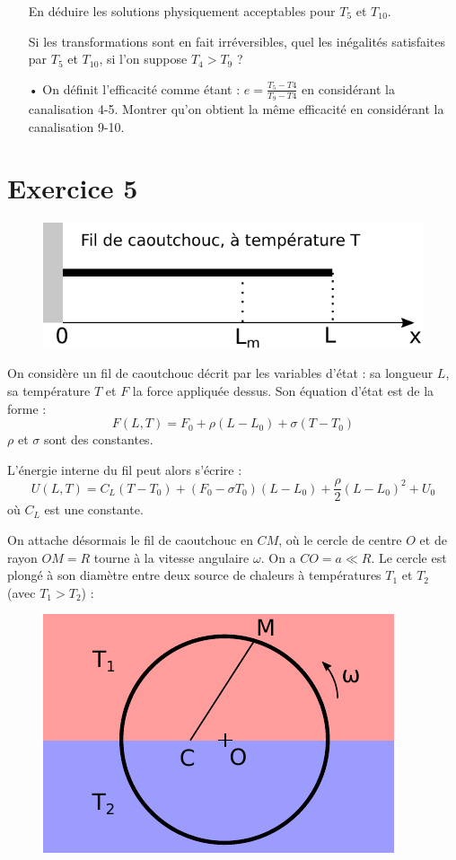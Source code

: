 \documentclass{report}
\begin{document}
\begin{itemize}
En déduire les solutions physiquement acceptables pour $T_{5}$ et $T_{10}$.

Si les transformations sont en fait irréversibles, quel les inégalités satisfaites par $T_{5}$ et $T_{10}$, si l'on suppose $T_{4}>T_{9}$ ?

\item[•] On définit l'efficacité comme étant : $e=\frac{T_{5}-T{4}}{T_{9}-T{4}}$ en considérant la canalisation 4-5. Montrer qu'on obtient la même efficacité en considérant la canalisation 9-10.
\end{itemize}

\newpage

\section*{Exercice 5}

\begin{figure}[!h]
\centering
\includegraphics[width=0.4\linewidth]{thermo2.pdf}
\end{figure}

On considère un fil de caoutchouc décrit par les variables d'état : sa longueur $L$, sa température $T$ et $F$ la force appliquée dessus. Son équation d'état est de la forme : 
\begin{equation}
	F(L,T) = F_0 + \rho(L-L_0) + \sigma(T-T_0)
\end{equation}
$\rho$ et $\sigma$ sont des constantes. 

L'énergie interne du fil peut alors s'écrire : 
\begin{equation}
	U(L,T) = C_L(T-T_0)+(F_0-\sigma T_0)(L-L_0) +\frac{ \rho}{2}(L-L_0)^2 +U_0
\end{equation}
où $C_L$ est une constante. 

On attache désormais le fil de caoutchouc en $CM$, où le cercle de centre $O$ et de rayon $OM=R$ tourne à la vitesse angulaire $\omega$. On a $CO=a\ll R$. Le cercle est plongé à son diamètre entre deux source de chaleurs à températures $T_1$ et $T_2$  (avec $T_1>T_2$) :

\begin{figure}[!h]
\centering
\includegraphics[width=0.3\linewidth]{thermo3.pdf}
\end{figure}
\end{document}
